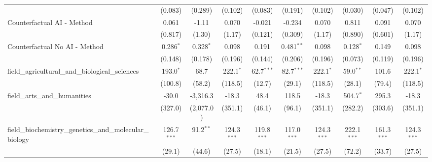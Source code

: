 \begin{tabular}{lccccccccc}
                                                               & (0.083)         & (0.289)         & (0.102)        & (0.083)       & (0.191)       & (0.102)        & (0.030)        & (0.047)       & (0.102)\\   
   Counterfactual AI - Method                                  & 0.061           & -1.11           & 0.070          & -0.021        & -0.234        & 0.070          & 0.811          & 0.091         & 0.070\\   
                                                               & (0.817)         & (1.30)          & (1.17)         & (0.121)       & (0.309)       & (1.17)         & (0.890)        & (0.601)       & (1.17)\\   
   Counterfactual No AI - Method                               & 0.286$^{*}$     & 0.328$^{*}$     & 0.098          & 0.191         & 0.481$^{**}$  & 0.098          & 0.128$^{*}$    & 0.149         & 0.098\\   
                                                               & (0.148)         & (0.178)         & (0.196)        & (0.144)       & (0.206)       & (0.196)        & (0.073)        & (0.119)       & (0.196)\\   
   field\_agricultural\_and\_biological\_sciences              & 193.0$^{*}$     & 68.7            & 222.1$^{*}$    & 62.7$^{***}$  & 82.7$^{***}$  & 222.1$^{*}$    & 59.0$^{**}$    & 101.6         & 222.1$^{*}$\\   
                                                               & (100.8)         & (58.2)          & (118.5)        & (12.7)        & (29.1)        & (118.5)        & (28.1)         & (79.4)        & (118.5)\\   
   field\_arts\_and\_humanities                                & -30.0           & -3,316.3        & -18.3          & 48.4          & 118.5         & -18.3          & 504.7$^{*}$    & 295.3         & -18.3\\   
                                                               & (327.0)         & (2,077.0)       & (351.1)        & (46.1)        & (96.1)        & (351.1)        & (282.2)        & (303.6)       & (351.1)\\   
   field\_biochemistry\_genetics\_and\_molecular\_biology      & 126.7$^{***}$   & 91.2$^{**}$     & 124.3$^{***}$  & 119.8$^{***}$ & 117.0$^{***}$ & 124.3$^{***}$  & 222.1$^{***}$  & 161.3$^{***}$ & 124.3$^{***}$\\   
                                                               & (29.1)          & (44.6)          & (27.5)         & (18.1)        & (21.5)        & (27.5)         & (72.2)         & (33.7)        & (27.5)\\   

\end{tabular}
